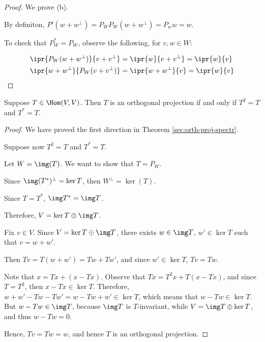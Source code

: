 \documentclass[11pt]{scrartcl}
\begin{document}
\begin{proof}
  \hfill

  We prove (b).

  By definiton, $P'(w+w^{\bot}) = P_W P_W(w+w^{\bot}) = P_w w = w$.

  To check that $P_W^{*} = P_{W}$, observe the following, for
  $v, w\in W$:

  \begin{align}
    \ipr{P_{W}(w+w^{\bot})}{v+v^{\bot}} &= \ipr{w}{v+v^{\bot}} = \ipr{w}{v}\\
    \ipr{w+w^{\bot}}{P_W(v+v^{\bot})} &= \ipr{w+w^{\bot}}{v} = \ipr{w}{v}
  \end{align}
\end{proof}

\begin{theorem}[6.24]
  Suppose $T \in \Hom(V,V)$. Then $T$ is an orthogonal projection if
  and only if $T^2=T$ and $T^{*}=T$.
\end{theorem}
\begin{proof}
  \hfill

  We have proved the first direction in Theorem
  \ref{sec:orth-proj-spectr}.

  Suppose now $T^2=T$ and $T^{*}=T$.
    
  Let $W=\img (T)$. We want to show that $T = P_{W}$.

  Since $\img (T^{*})^{\bot} = \ker T$, then $W^{\bot} = \ker(T)$.

  Since $T=T^{*}$, $\img T^{*} = \img T$.

  Therefore, $V = \ker T \oplus \img T$.

  Fix $v\in V$. Since $V = \ker T \oplus \img T$, there exists
  $w\in \img T$, $w' \in \ker T$ such that $v = w+w'$.

  Then $Tv = T(w+w') = Tw + Tw'$, and since $w'\in\ker T$, $Tv = Tw$.

  Note that $x = Tx + (x - Tx)$. Observe that $Tx = T^2x+ T(x-Tx)$,
  and since $T=T^{2}$, then $x-Tx \in \ker T$. Therefore,
  $w+w' - Tw - Tw' = w-Tw + w' \in \ker T$, which means that
  $w-Tw \in \ker T$. But $w-Tw\in\img T$, because $\img T$ is
  $T$-invariant, while $V = \img T \oplus \ker T$, and thus $w-Tw = 0$.

  Hence, $Tv = Tw = w$, and hence $T$ is an orthogonal projection.
\end{proof}
\end{document}
